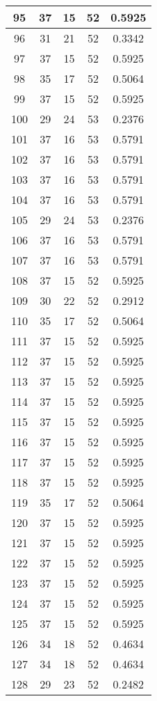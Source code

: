 \documentclass[letterpaper, 12pt]{article}
\begin{document}
\begin{longtable}{|c|c|c|c|c|}
\hline
95 & 37 & 15 & 52 & 0.5925 \\
\hline
96 & 31 & 21 & 52 & 0.3342 \\
\hline
97 & 37 & 15 & 52 & 0.5925 \\
\hline
98 & 35 & 17 & 52 & 0.5064 \\
\hline
99 & 37 & 15 & 52 & 0.5925 \\
\hline
100 & 29 & 24 & 53 & 0.2376 \\
\hline
101 & 37 & 16 & 53 & 0.5791 \\
\hline
102 & 37 & 16 & 53 & 0.5791 \\
\hline
103 & 37 & 16 & 53 & 0.5791 \\
\hline
104 & 37 & 16 & 53 & 0.5791 \\
\hline
105 & 29 & 24 & 53 & 0.2376 \\
\hline
106 & 37 & 16 & 53 & 0.5791 \\
\hline
107 & 37 & 16 & 53 & 0.5791 \\
\hline
108 & 37 & 15 & 52 & 0.5925 \\
\hline
109 & 30 & 22 & 52 & 0.2912 \\
\hline
110 & 35 & 17 & 52 & 0.5064 \\
\hline
111 & 37 & 15 & 52 & 0.5925 \\
\hline
112 & 37 & 15 & 52 & 0.5925 \\
\hline
113 & 37 & 15 & 52 & 0.5925 \\
\hline
114 & 37 & 15 & 52 & 0.5925 \\
\hline
115 & 37 & 15 & 52 & 0.5925 \\
\hline
116 & 37 & 15 & 52 & 0.5925 \\
\hline
117 & 37 & 15 & 52 & 0.5925 \\
\hline
118 & 37 & 15 & 52 & 0.5925 \\
\hline
119 & 35 & 17 & 52 & 0.5064 \\
\hline
120 & 37 & 15 & 52 & 0.5925 \\
\hline
121 & 37 & 15 & 52 & 0.5925 \\
\hline
122 & 37 & 15 & 52 & 0.5925 \\
\hline
123 & 37 & 15 & 52 & 0.5925 \\
\hline
124 & 37 & 15 & 52 & 0.5925 \\
\hline
125 & 37 & 15 & 52 & 0.5925 \\
\hline
126 & 34 & 18 & 52 & 0.4634 \\
\hline
127 & 34 & 18 & 52 & 0.4634 \\
\hline
128 & 29 & 23 & 52 & 0.2482 \\

\end{longtable}
\end{document}
